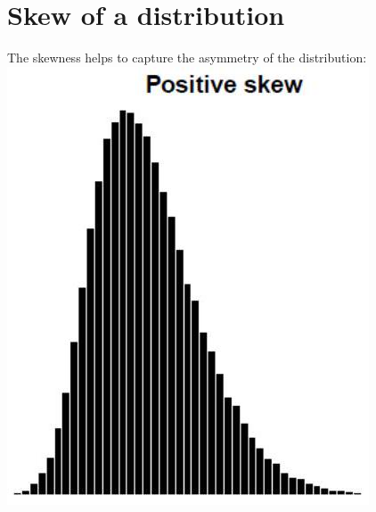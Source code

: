 \documentclass[10pt]{article}
\begin{document}
\section*{Skew of a distribution}
The skewness helps to capture the asymmetry of the distribution:\\
\includegraphics[max width=\textwidth, center]{2025_05_11_35704811148ad612caa6g-20(1)}\\
\end{document}
